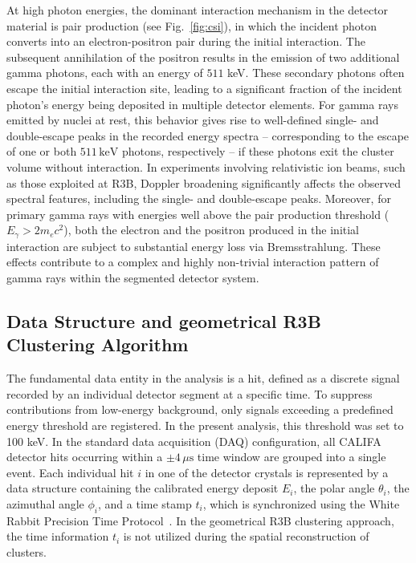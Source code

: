 \documentclass[review,sort&compress]{elsarticle}
\begin{document}
At high photon energies, the dominant interaction mechanism in the detector material is pair production (see Fig.~\ref{fig:csi}), in which the incident photon converts into an electron-positron pair during the initial interaction. The subsequent annihilation of the positron results in the emission of two additional gamma photons, each with an energy of $511$ keV. These secondary photons often escape the initial interaction site, leading to a significant fraction of the incident photon’s energy being deposited in multiple detector elements.\newline
For gamma rays emitted by nuclei at rest, this behavior gives rise to well-defined single- and double-escape peaks in the recorded energy spectra -- corresponding to the escape of one or both $511\,\mathrm{keV}$ photons, respectively -- if these photons exit the cluster volume without interaction.\newline
In experiments involving relativistic ion beams, such as those exploited at R3B, Doppler broadening significantly affects the observed spectral features, including the single- and double-escape peaks. Moreover, for primary gamma rays with energies well above the pair production threshold ($E_{\gamma} > 2m_{e}c^2$), both the electron and the positron produced in the initial interaction are subject to substantial energy loss via Bremsstrahlung. These effects contribute to a complex and highly non-trivial interaction pattern of gamma rays within the segmented detector system.\newline

\subsection{Data Structure and geometrical R3B Clustering Algorithm}\label{s_sec:r3b_clustering}
The fundamental data entity in the analysis is a hit, defined as a discrete signal recorded by an individual detector segment at a specific time. To suppress contributions from low-energy background, only signals exceeding a predefined energy threshold are registered. In the present analysis, this threshold was set to 100 keV.\newline
In the standard data acquisition (DAQ) configuration, all CALIFA detector hits occurring within a $\pm 4\,\mu\mathrm{s}$ time window are grouped into a single event. Each individual hit \( i \) in one of the detector crystals is represented by a data structure containing the calibrated energy deposit \( E_i \), the polar angle \( \theta_i \), the azimuthal angle \( \phi_i \), and a time stamp \( t_i \), which is synchronized using the White Rabbit Precision Time Protocol~\cite{lipinski2011white}.\newline
In the geometrical R3B clustering approach, the time information $t_i$ is not utilized during the spatial reconstruction of clusters.\newline
\end{document}
